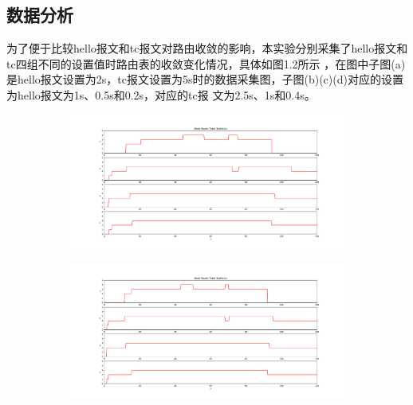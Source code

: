 \documentclass[a4paper,12pt]{report}
\begin{document}
\begin{spacing}{1.5}
\section{数据分析}
为了便于比较hello报文和tc报文对路由收敛的影响，本实验分别采集了hello报文和tc四组不同的设置值时路由表的收敛变化情况，具体如图1.2所示
，在图中子图(a)是hello报文设置为2s，tc报文设置为5s时的数据采集图，子图(b)(c)(d)对应的设置为hello报文为1s、0.5s和0.2s，对应的tc报
文为2.5s、1s和0.4s。

\begin{figure}[hbtp]
\centering
\begin{subfigure}[t]{0.4\textwidth}
\centering
	\includegraphics [width=1\textwidth]{figure//route1.pdf}
\end{subfigure}
\quad
\begin{subfigure}[t]{0.4\textwidth}
\centering
	\includegraphics [width=1\textwidth]{figure//route2.pdf}
\end{subfigure}


\end{figure}
\end{spacing}
\end{document}
